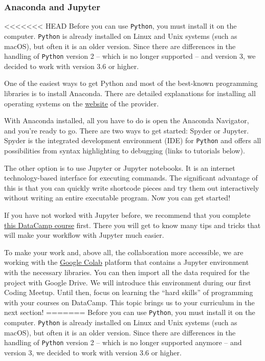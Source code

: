 \documentclass[
  11pt,
]{article}
\begin{document}
\hypertarget{anaconda-and-jupyter}{%
\subsubsection{Anaconda and Jupyter}\label{anaconda-and-jupyter}}

<<<<<<< HEAD
Before you can use \texttt{Python}, you must install it on the computer.
\texttt{Python} is already installed on Linux and Unix systems (such as macOS), but often it is an older version.
Since there are differences in the handling of \texttt{Python} version 2 -- which is no longer supported -- and version 3, we decided to work with version 3.6 or higher.

One of the easiest ways to get Python and most of the best-known programming libraries is to install Anaconda.
There are detailed explanations for installing all operating systems on the \href{https://docs.anaconda.com/anaconda/install/}{website} of the provider.

With Anaconda installed, all you have to do is open the Anaconda Navigator, and you're ready to go.
There are two ways to get started: Spyder or Jupyter.
Spyder is the integrated development environment (IDE) for \texttt{Python} and offers all possibilities from syntax highlighting to debugging (links to tutorials below).

The other option is to use Jupyter or Jupyter notebooks.
It is an internet technology-based interface for executing commands.
The significant advantage of this is that you can quickly write shortcode pieces and try them out interactively without writing an entire executable program.
Now you can get started!

If you have not worked with Jupyter before, we recommend that you complete \href{https://app.datacamp.com/learn/projects/introduction-to-projects/guided/Python}{this DataCamp course} first.
There you will get to know many tips and tricks that will make your workflow with Jupyter much easier.

To make your work and, above all, the collaboration more accessible, we are working with the \href{https://colab.research.google.com/notebooks/basic_features_overview.ipynb}{Google Colab} platform that contains a Jupyter environment with the necessary libraries.
You can then import all the data required for the project with Google Drive.
We will introduce this environment during our first Coding Meetup.
Until then, focus on learning the ``hard skills'' of programming with your courses on DataCamp.
This topic brings us to your curriculum in the next section!
=======
Before you can use \texttt{Python}, you must install it on the computer. \texttt{Python} is already installed on Linux and Unix systems (such as macOS), but often it is an older version. Since there are differences in the handling of \texttt{Python} version 2 -- which is no longer supported anymore -- and version 3, we decided to work with version 3.6 or higher.
\end{document}
